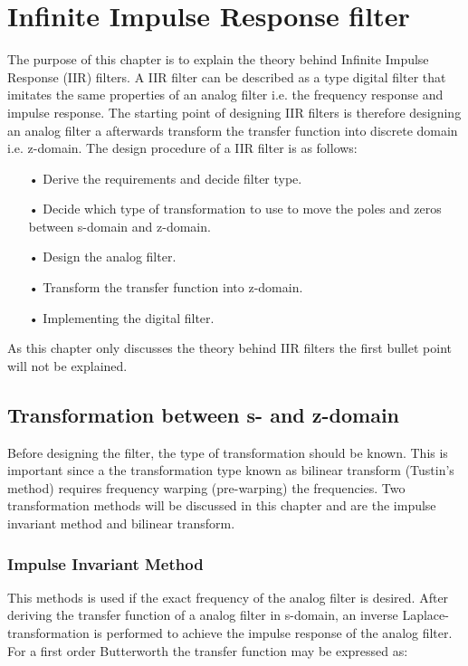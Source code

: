 \chapter{Infinite Impulse Response filter}

The purpose of this chapter is to explain the theory behind Infinite Impulse Response (IIR) filters. A IIR filter can be described as a type digital filter that imitates the same properties of an analog filter i.e. the frequency response and impulse response. The starting point of designing IIR filters is therefore designing an analog filter a afterwards transform the transfer function into discrete domain i.e. z-domain. The design procedure of a IIR filter is as follows:

\begin{itemize}
\item[•] Derive the requirements and decide filter type.
\item[•] Decide which type of transformation to use to move the poles and zeros between s-domain and z-domain.
\item[•] Design the analog filter.
\item[•] Transform the transfer function into z-domain.
\item[•] Implementing the digital filter.
\end{itemize}

As this chapter only discusses the theory behind IIR filters the first bullet point will not be explained.


\section{Transformation between s- and z-domain}

Before designing the filter, the type of transformation should be known. This is important since a the transformation type known as bilinear transform (Tustin's method) requires frequency warping (pre-warping) the frequencies. Two transformation methods will be discussed in this chapter and are the impulse invariant method and bilinear transform.

\subsection{Impulse Invariant Method}

This methods is used if the exact frequency of the analog filter is desired. After deriving the transfer function of a analog filter in s-domain, an inverse Laplace-transformation is performed to achieve the impulse response of the analog filter. For a  first order Butterworth the transfer function may be expressed as:

